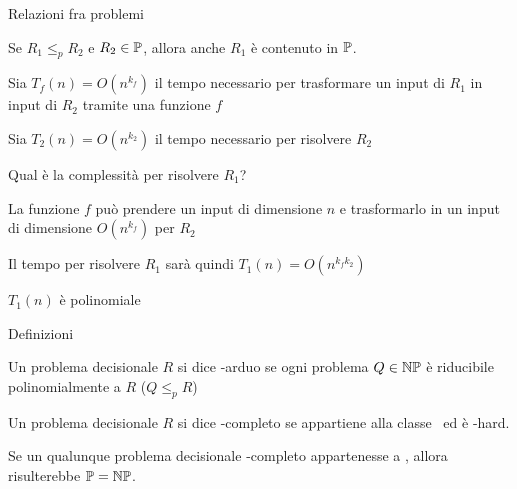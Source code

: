 \begin{frame}{Relazioni fra problemi}

\vspace{-9pt}
\begin{myboxtitle}[Lemma]
Se $R_1 \leq_p R_2$ e $R_2 \in \mbox{\sc $\mathbb{P}$}$, allora anche
$R_1$ è contenuto in $\mbox{\sc $\mathbb{P}$}$.
\end{myboxtitle}

\begin{myboxtitle}[Dimostrazione]
\BI
\item Sia $T_f(n)=O(n^{k_f})$ il tempo necessario per trasformare un input di $R_1$ in input di $R_2$ tramite una funzione $f$
\item Sia $T_2(n)=O(n^{k_2})$ il tempo necessario per risolvere $R_2$
\item Qual è la complessità per risolvere $R_1$? 
\EI
\pause\smallskip
\BI
\item La funzione $f$ può prendere un input di dimensione
$n$ e trasformarlo in un input di dimensione $O(n^{k_f})$ per $R_2$
\item Il tempo per risolvere $R_1$ sarà quindi $T_1(n) = O(n^{k_f k_2})$
\item $T_1(n)$ è polinomiale
\EI
\end{myboxtitle}
\end{frame}

\begin{frame}{Definizioni}
    
\vspace{-9pt}
\begin{myboxtitle}
Un problema decisionale $R$ si dice \alert{\NP-arduo} se
ogni problema $Q \in \mbox{$\mathbb{NP}$}$ è riducibile
polinomialmente a $R$ ($Q \leq_p R$)
\end{myboxtitle}

\begin{myboxtitle}
Un problema decisionale $R$ si dice \alert{\NP-completo} se appartiene alla
classe \NP\ ed è \NP-hard.
\end{myboxtitle}

\begin{myboxtitle}[\PTIME=\NP?]
Se un qualunque problema decisionale \NP-completo appartenesse
a \PTIME, allora risulterebbe $\mbox{\sc $\mathbb{P}$}=\mbox{$\mathbb{NP}$}$.
\end{myboxtitle}

\end{frame}

